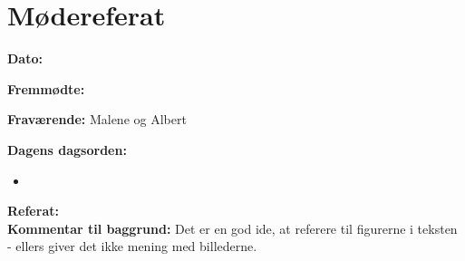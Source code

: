 \chapter{Mødereferat}

\textbf{Dato:} 

\textbf{Fremmødte:} 

\textbf{Fraværende:} Malene og Albert

\textbf{Dagens dagsorden:}
\begin{itemize}
	\item 
\end{itemize}

\textbf{Referat:}
\\
\textbf{Kommentar til baggrund:} Det er en god ide, at referere til figurerne i teksten - ellers giver det ikke mening med billederne. 
\\
\\


